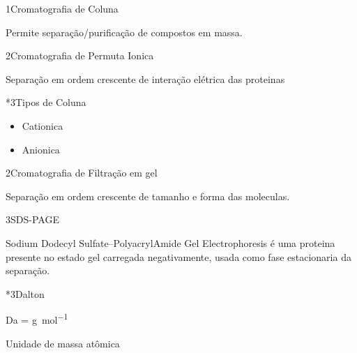 \documentclass[\mainfilename]{subfiles}
\begin{document}

\begin{sectionBox}1{Cromatografia de Coluna}
    
    Permite separação/purificação de compostos em massa.
    
\end{sectionBox}

\begin{sectionBox}2{Cromatografia de Permuta Ionica}
    
    Separação em ordem crescente de interação elétrica das proteinas

    \begin{sectionBox}*3{Tipos de Coluna}
        
        \begin{itemize}
            \item Cationica
            \item Anionica
        \end{itemize}
        
    \end{sectionBox}
    
\end{sectionBox}

\begin{sectionBox}2{Cromatografia de Filtração em gel}
    
    Separação em ordem crescente de tamanho e forma das moleculas.

\end{sectionBox}

\begin{questionBox}3{SDS-PAGE}
    
    Sodium Dodecyl Sulfate–PolyacrylAmide Gel Electrophoresis é uma proteina presente no estado gel carregada negativamente, usada como fase estacionaria da separação.
    
\end{questionBox}

\begin{sectionBox}*3{Dalton}

    \begin{BM}
        \unit{\dalton} = \unit{\gram\per\mole}
    \end{BM}

    Unidade de massa atômica
    
\end{sectionBox}
\end{document}
